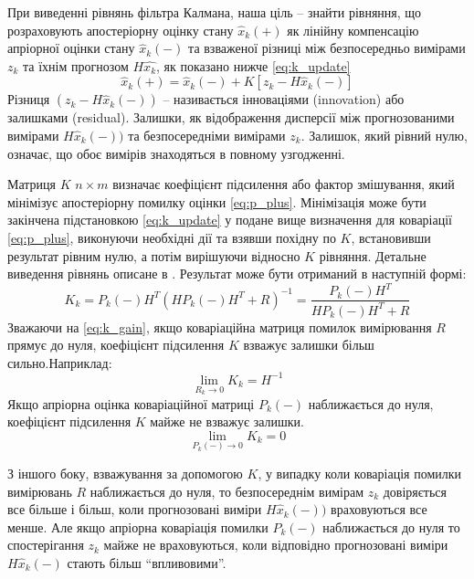 При виведенні рівнянь фільтра Калмана, наша ціль -- знайти рівняння, що 
розраховують апостеріорну оцінку стану $\hat{x}_{k}(+)$ як лінійну компенсацію
апріорної оцінки стану $\hat{x}_{k}(-)$ та взваженої різниці між безпосередньо
вимірами $z_{k}$ та їхнім прогнозом $H\hat{x_{k}}$, як показано нижче \eqref{eq:k_update}
\begin{equation}
  \label{eq:k_update}
 \hat{x}_{k}(+)= \hat{x}_{k}(-) + K\left[z_{k}-H\hat{x}_{k}(-)\right]
\end{equation}
Різниця $(z_{k}-H\hat{x}_{k}(-))$  -- називається інноваціями (innovation) 
або залишками (residual). Залишки, як відображення дисперсії між прогнозованими
вимірами $H\hat{x}_{k}(-))$ та безпосередніми вимірами $z_{k}$. Залишок, який
рівний нулю, означає, що обоє вимірів знаходяться в повному узгодженні.

Матриця $K$ $n \times m$ визначає коефіцієнт підсилення або фактор
змішування, який мінімізує апостеріорну помилку оцінки \eqref{eq:p_plus}.
Мінімізація може бути закінчена підстановкою \eqref{eq:k_update} у подане 
вище визначення для коваріації \eqref{eq:p_plus}, виконуючи необхідні дії та
взявши похідну по $K$, встановивши результат рівним нулю, а потім
вирішуючи відносно $K$ рівняння. Детальне виведення рівнянь описане в \cite{bib:gps_ins}.
Результат може бути отриманий в наступній формі:
\begin{equation}
  \label{eq:k_gain}
  K_{k}=P_{k}(-)H^{T}(HP_{k}(-)H^{T}+R)^{-1} = \frac{P_{k}(-)H^{T}}{HP_{k}(-)H^{T}+R} 
\end{equation}
Зважаючи на \eqref{eq:k_gain}, якщо коваріаційна матриця помилок вимірювання
$R$ прямує до нуля, коефіцієнт підсилення $K$ взважує залишки 
більш сильно.Наприклад:
\begin{equation}
  \label{eq:lim_R}
  \displaystyle\lim_{R_{k}\to 0} K_{k} = H^{-1}
\end{equation}
Якщо апріорна оцінка коваріаційної матриці $P_{k}(-)$ наближається
до нуля, коефіцієнт підсилення $K$ майже не взважує залишки.
\begin{equation}
  \label{eq:lim_P_minus}
  \displaystyle\lim_{P_{k}(-)\to 0} K_{k} = 0
\end{equation}

З іншого боку, взважування за допомогою $K$, у випадку коли коваріація 
помилки вимірювань $R$ наближається до нуля, то безпосереднім вимірам
$z_{k}$ довіряється все більше і більш, коли прогнозовані виміри $H\hat{x}_{k}(-))$
враховуються все менше. Але якщо апріорна коваріація помилки $P_{k}(-)$ наближається
до нуля то спостерігання $z_{k}$ майже не враховуються, коли відповідно
прогнозовані виміри $H\hat{x}_{k}(-)$ стають більш ``впливовими''.

